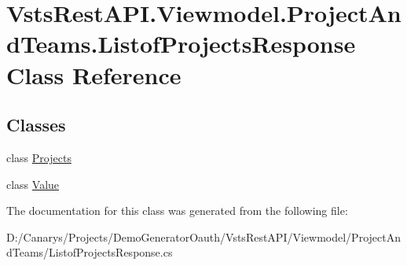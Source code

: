 \hypertarget{class_vsts_rest_a_p_i_1_1_viewmodel_1_1_project_and_teams_1_1_listof_projects_response}{}\section{Vsts\+Rest\+A\+P\+I.\+Viewmodel.\+Project\+And\+Teams.\+Listof\+Projects\+Response Class Reference}
\label{class_vsts_rest_a_p_i_1_1_viewmodel_1_1_project_and_teams_1_1_listof_projects_response}
\subsection*{Classes}
\begin{DoxyCompactItemize}
\item 
class \mbox{\hyperlink{class_vsts_rest_a_p_i_1_1_viewmodel_1_1_project_and_teams_1_1_listof_projects_response_1_1_projects}{Projects}}
\item 
class \mbox{\hyperlink{class_vsts_rest_a_p_i_1_1_viewmodel_1_1_project_and_teams_1_1_listof_projects_response_1_1_value}{Value}}
\end{DoxyCompactItemize}


The documentation for this class was generated from the following file\+:\begin{DoxyCompactItemize}
\item 
D\+:/\+Canarys/\+Projects/\+Demo\+Generator\+Oauth/\+Vsts\+Rest\+A\+P\+I/\+Viewmodel/\+Project\+And\+Teams/Listof\+Projects\+Response.\+cs\end{DoxyCompactItemize}
